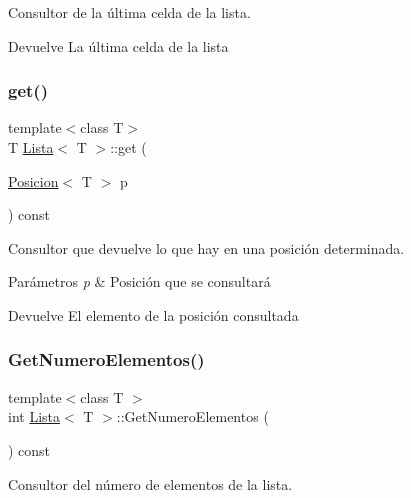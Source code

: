 Consultor de la última celda de la lista. 

\begin{DoxyReturn}{Devuelve}
La última celda de la lista 
\end{DoxyReturn}
\mbox{\label{classLista_add1ea7959a85ded8e73f944259f04328}} 
\subsubsection{\texorpdfstring{get()}{get()}}
{\footnotesize\ttfamily template$<$class T$>$ \\
T \mbox{\hyperlink{classLista}{Lista}}$<$ T $>$\+::get (\begin{DoxyParamCaption}\item[{\mbox{\hyperlink{classPosicion}{Posicion}}$<$ T $>$}]{p }\end{DoxyParamCaption}) const}



Consultor que devuelve lo que hay en una posición determinada. 


\begin{DoxyParams}{Parámetros}
{\em p} & Posición que se consultará \\
\hline
\end{DoxyParams}
\begin{DoxyReturn}{Devuelve}
El elemento de la posición consultada 
\end{DoxyReturn}
\mbox{\label{classLista_a59dba3aa3e7c54996e33e5c8c6dabfa2}} 
\subsubsection{\texorpdfstring{GetNumeroElementos()}{GetNumeroElementos()}}
{\footnotesize\ttfamily template$<$class T $>$ \\
int \mbox{\hyperlink{classLista}{Lista}}$<$ T $>$\+::Get\+Numero\+Elementos (\begin{DoxyParamCaption}{ }\end{DoxyParamCaption}) const}



Consultor del número de elementos de la lista. 


